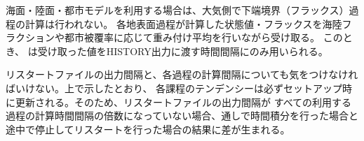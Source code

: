 
海面・陸面・都市モデルを利用する場合は、大気側で下端境界（フラックス）過程の計算は行われない。
各地表面過程が計算した状態値・フラックスを海陸フラクションや都市被覆率に応じて重み付け平均を行いながら受け取る。
このとき、 は受け取った値をHISTORY出力に渡す時間間隔にのみ用いられる。

リスタートファイルの出力間隔と、各過程の計算間隔についても気をつけなければいけない。上で示したとおり、
各課程のテンデンシーは必ずセットアップ時に更新される。そのため、リスタートファイルの出力間隔が
すべての利用する過程の計算時間間隔の倍数になっていない場合、通しで時間積分を行った場合と
途中で停止してリスタートを行った場合の結果に差が生まれる。
